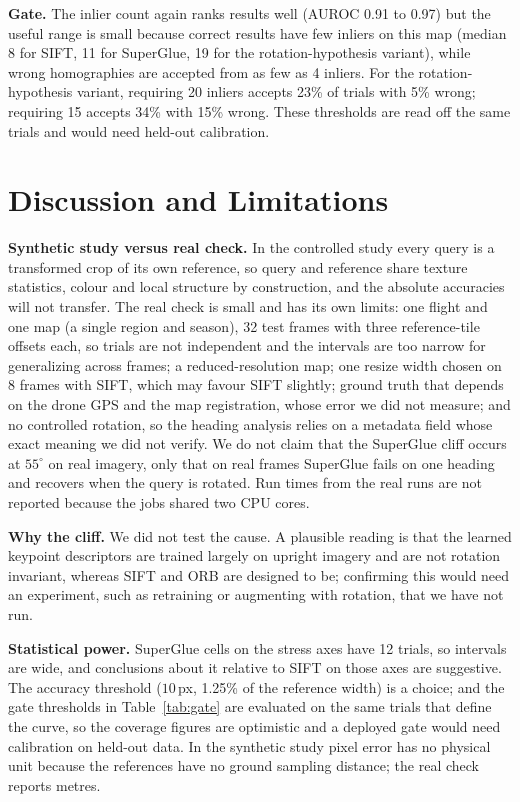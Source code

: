 \documentclass[conference]{IEEEtran}
\begin{document}
\textbf{Gate.} The inlier count again ranks results well (AUROC 0.91 to 0.97) but the useful range is small because correct results have few inliers on this map (median 8 for SIFT, 11 for SuperGlue, 19 for the rotation-hypothesis variant), while wrong homographies are accepted from as few as 4 inliers. For the rotation-hypothesis variant, requiring 20 inliers accepts 23\% of trials with 5\% wrong; requiring 15 accepts 34\% with 15\% wrong. These thresholds are read off the same trials and would need held-out calibration.


\section{Discussion and Limitations}
\label{sec:limits}

\textbf{Synthetic study versus real check.} In the controlled study every query is a transformed crop of its own reference, so query and reference share texture statistics, colour and local structure by construction, and the absolute accuracies will not transfer. The real check is small and has its own limits: one flight and one map (a single region and season), 32 test frames with three reference-tile offsets each, so trials are not independent and the intervals are too narrow for generalizing across frames; a reduced-resolution map; one resize width chosen on 8 frames with SIFT, which may favour SIFT slightly; ground truth that depends on the drone GPS and the map registration, whose error we did not measure; and no controlled rotation, so the heading analysis relies on a metadata field whose exact meaning we did not verify. We do not claim that the SuperGlue cliff occurs at $55^\circ$ on real imagery, only that on real frames SuperGlue fails on one heading and recovers when the query is rotated. Run times from the real runs are not reported because the jobs shared two CPU cores.

\textbf{Why the cliff.} We did not test the cause. A plausible reading is that the learned keypoint descriptors are trained largely on upright imagery and are not rotation invariant, whereas SIFT and ORB are designed to be; confirming this would need an experiment, such as retraining or augmenting with rotation, that we have not run.

\textbf{Statistical power.} SuperGlue cells on the stress axes have 12 trials, so intervals are wide, and conclusions about it relative to SIFT on those axes are suggestive. The accuracy threshold ($10$\,px, 1.25\% of the reference width) is a choice; and the gate thresholds in Table~\ref{tab:gate} are evaluated on the same trials that define the curve, so the coverage figures are optimistic and a deployed gate would need calibration on held-out data. In the synthetic study pixel error has no physical unit because the references have no ground sampling distance; the real check reports metres.
\end{document}
